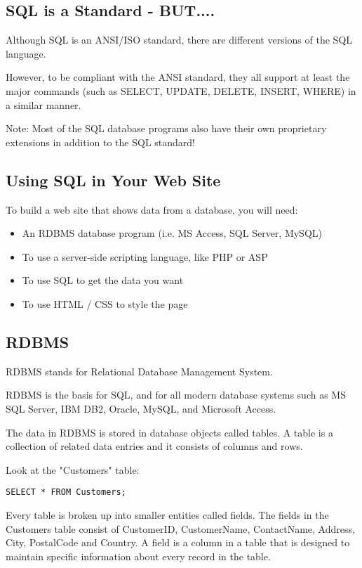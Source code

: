 \documentclass[a4paper,12pt]{article}
\begin{document}
\subsection{SQL is a Standard - BUT....}

Although SQL is an ANSI/ISO standard, there are different versions of the SQL language.

However, to be compliant with the ANSI standard, they all support at least the major commands (such as SELECT, UPDATE, DELETE, INSERT, WHERE) in a similar manner.


Note: Most of the SQL database programs also have their own proprietary extensions in addition to the SQL standard!



\subsection{Using SQL in Your Web Site}

To build a web site that shows data from a database, you will need:

\begin{itemize}
	\item An RDBMS database program (i.e. MS Access, SQL Server, MySQL)
	\item To use a server-side scripting language, like PHP or ASP
	\item To use SQL to get the data you want
	\item To use HTML / CSS to style the page
\end{itemize}


\subsection{RDBMS}

RDBMS stands for Relational Database Management System.

RDBMS is the basis for SQL, and for all modern database systems such as MS SQL Server, IBM DB2, Oracle, MySQL, and Microsoft Access.

The data in RDBMS is stored in database objects called tables. A table is a collection of related data entries and it consists of columns and rows.

Look at the "Customers" table:


\begin{lstlisting}
SELECT * FROM Customers;
\end{lstlisting}


Every table is broken up into smaller entities called fields. The fields in the Customers table consist of CustomerID, CustomerName, ContactName, Address, City, PostalCode and Country. A field is a column in a table that is designed to maintain specific information about every record in the table.
\end{document}
